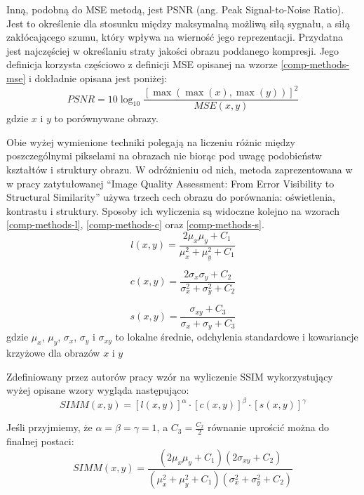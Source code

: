 \documentclass[a4paper, 12pt, polish, twoside]{extreport}
\begin{document}
    Inną, podobną do MSE metodą, jest PSNR (ang. Peak Signal-to-Noise Ratio). Jest to określenie dla stosunku między maksymalną możliwą siłą sygnału, a siłą zakłócającego szumu, który wpływa na wierność jego reprezentacji. Przydatna jest najczęściej w określaniu straty jakości obrazu poddanego kompresji. Jego definicja korzysta częściowo z definicji MSE opisanej na wzorze \ref{comp-methods-mse} i dokładnie opisana jest poniżej: 
    \begin{equation} \label{comp-methods-psnr}
       PSNR=10\log_{10} \frac{[\max(\max(x),\max(y))]^2}{MSE(x,y)}
    \end{equation}
    gdzie \(x\) i \(y\) to porównywane obrazy.
    
    Obie wyżej wymienione techniki polegają na liczeniu różnic między poszczególnymi pikselami na obrazach nie biorąc pod uwagę podobieństw kształtów i struktury obrazu. W odróżnieniu od nich, metoda zaprezentowana w
    w pracy zatytułowanej ``Image Quality Assessment: From Error Visibility to Structural Similarity'' używa trzech cech obrazu do porównania: oświetlenia, kontrastu i struktury. Sposoby ich wyliczenia są widoczne kolejno na wzorach \ref{comp-methods-l}, \ref{comp-methods-c} oraz \ref{comp-methods-s}. 
    \begin{equation} \label{comp-methods-l}
       l(x,y)=\frac{2\mu_x	\mu_y + C_1}{\mu_x^2 + \mu_y^2 + C_1}
    \end{equation}
    
    \begin{equation} \label{comp-methods-c}
       c(x,y)=\frac{2\sigma_x	\sigma_y + C_2}{\sigma_x^2 + \sigma_y^2 + C_2}
    \end{equation}
    
    \begin{equation} \label{comp-methods-s}
       s(x,y)=\frac{\sigma_{xy} + C_3}{\sigma_x + \sigma_y + C_3}
    \end{equation}
    gdzie \(\mu_x\), \(\mu_y\), \(\sigma_x\), \(\sigma_y\) i \(\sigma_{xy}\) to lokalne średnie, odchylenia standardowe i kowariancje krzyżowe dla obrazów \(x\) i \(y\) 
    
    Zdefiniowany przez autorów pracy wzór na wyliczenie SSIM wykorzystujący wyżej opisane wzory wygląda następująco:
    \begin{equation} \label{comp-methods-ssim-assumed}
       SIMM(x,y)=[l(x,y)]^{\alpha} \cdot [c(x,y)]^{\beta} \cdot [s(x,y)]^{\gamma}
    \end{equation}
    
    Jeśli przyjmiemy, że \(\alpha = \beta = \gamma = 1\), a \(C_3 = \frac{C_2}{2}\) równanie uprościć można do finalnej postaci:
    \begin{equation} \label{comp-methods-ssim}
       SIMM(x,y)=\frac{(2\mu_x\mu_y + C_1)(2\sigma_{xy} + C_2)}{(\mu_x^2 + \mu_y^2 + C_1)(\sigma_x^2 + \sigma_y^2 + C_2)}
    \end{equation}
    
\end{document}
